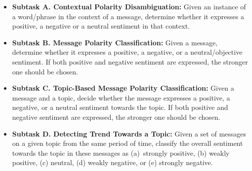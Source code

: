 \documentclass[11pt]{article}
\begin{document}
\begin{itemize}[leftmargin=*]

\item \textbf{Subtask A. Contextual Polarity Disambiguation:} Given an instance of a word/phrase in the context of a message, determine whether it expresses a positive, a negative or a neutral sentiment in that context.


\item \textbf{Subtask B. Message Polarity Classification:} Given a message, determine whether it expresses a positive, a negative, or a neutral/objective sentiment. If both positive and negative sentiment are expressed, the stronger one should be chosen.


\item \textbf{Subtask C. Topic-Based Message Polarity Classification:} Given a message and a topic, decide whether the message expresses a positive, a negative, or a neutral sentiment towards the topic. If both positive and negative sentiment are expressed, the stronger one should be chosen.


\item \textbf{Subtask D. Detecting Trend Towards a Topic:} Given a set of messages on a given topic from the same period of time, classify the overall sentiment towards the topic in these messages as (a)~strongly positive, (b) weakly positive, (c) neutral, (d) weakly negative, or (e) strongly negative.



\end{itemize}
\end{document}
